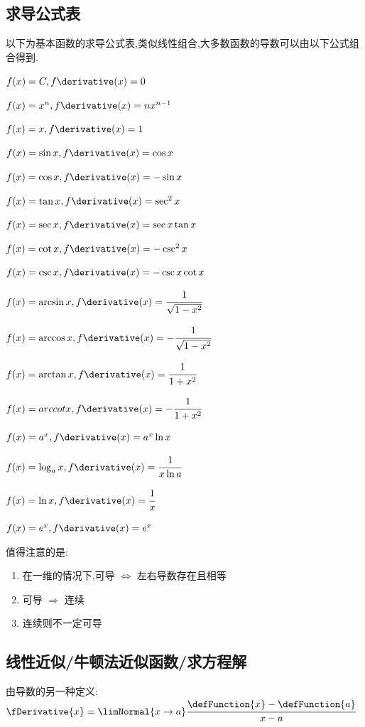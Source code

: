 {{  \subsection{求导公式表}{
    以下为基本函数的求导公式表,类似线性组合,大多数函数的导数可以由以下公式组合得到.

    $f(x) = C, f\derivative(x) = 0$

    $f(x) = x^n, f\derivative(x) = nx^{n-1}$

    $f(x) = x, f\derivative(x) = 1$

    $f(x) = \sin x, f\derivative(x) = \cos x$

    $f(x) = \cos x, f\derivative(x) = -\sin x$

    $f(x) = \tan x, f\derivative(x) = \sec^2 x$

    $f(x) = \sec x, f\derivative(x) = \sec x\tan x$

    $f(x) = \cot x, f\derivative(x) = -\csc^2 x$

    $f(x) = \csc x, f\derivative(x) = -\csc x\cot x$

    $f(x) = \arcsin x, f\derivative(x) = \cfrac{1}{\sqrt{1 - x^2}}$

    $f(x) = \arccos x, f\derivative(x) = -\cfrac{1}{\sqrt{1 - x^2}}$

    $f(x) = \arctan x, f\derivative(x) = \cfrac{1}{1 + x^2}$

    $f(x) = arccotx, f\derivative(x) = -\cfrac{1}{1 + x^2}$

    $f(x) = a^x, f\derivative(x) = a^x\ln x$

    $f(x) = \log_a x, f\derivative(x) = \cfrac{1}{x\ln a}$

    $f(x) = \ln x, f\derivative(x)= \cfrac{1}{x}$

    $f(x) = e^x, f\derivative(x) = e^x$
  }%
  \newline

  值得注意的是:
  \begin{enumerate}
    \item 在一维的情况下,可导 $\Leftrightarrow$ 左右导数存在且相等

    \item 可导 $\Rightarrow$ 连续

    \item 连续则不一定可导
  \end{enumerate}

  \subsection{线性近似/牛顿法近似函数/求方程解}{
    由导数的另一种定义:$\fDerivative{x} = \limNormal{x \to a}\cfrac{\defFunction{x} - \defFunction{a}}{x - a}$

}}}
